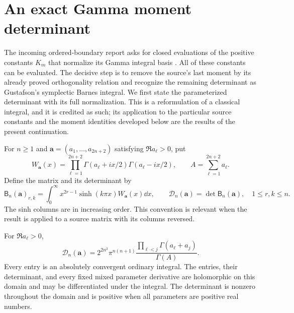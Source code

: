 \section{An exact Gamma moment determinant}
\label{gn:sec:determinant}

The incoming ordered-boundary report asks for closed evaluations of the
positive constants $K_m$ that normalize its Gamma integral basis
\cite[Section~8 and Section~9, question~2]{repoordered}.  All of these
constants can be evaluated.  The decisive step is to remove the source's
last moment by its already proved orthogonality relation and recognize
the remaining determinant as Gustafson's symplectic Barnes integral.
We first state the parameterized determinant with its full normalization.
This is a reformulation of a classical integral, and it is credited as
such; its application to the particular source constants and the moment
identities developed below are the results of the present continuation.

For $n\ge1$ and $\mathbf a=(a_1,\ldots,a_{2n+2})$ satisfying
$\Re a_\ell>0$, put
\begin{equation}\label{gn:eq:weight}
 W_{\mathbf a}(x)=\prod_{\ell=1}^{2n+2}
       \Gamma(a_\ell+ix/2)\Gamma(a_\ell-ix/2),
 \qquad A=\sum_{\ell=1}^{2n+2}a_\ell.
\end{equation}
Define the matrix and its determinant by
\begin{equation}\label{gn:eq:matrix}
 \mathsf B_n(\mathbf a)_{r,k}
 =\int_0^\infty x^{2r-1}\sinh(k\pi x)W_{\mathbf a}(x)\dd x,
 \qquad
 \mathcal D_n(\mathbf a)=\det\mathsf B_n(\mathbf a),
 \quad 1\le r,k\le n.
\end{equation}
The sinh columns are in increasing order.  This convention is relevant
when the result is applied to a source matrix with its columns reversed.

\begin{theorem}
\label{gn:thm:determinant}
For $\Re a_\ell>0$,
\begin{equation}\label{gn:eq:determinant}
 \boxed{\displaystyle
 \mathcal D_n(\mathbf a)
 =2^{2n^2}\pi^{n(n+1)}
       \frac{\prod_{\ell<j}\Gamma(a_\ell+a_j)}{\Gamma(A)}.}
\end{equation}
Every entry is an absolutely convergent ordinary integral.  The entries,
their determinant, and every fixed mixed parameter derivative are
holomorphic on this domain and may be differentiated under the integral.
The determinant is nonzero throughout the domain and is positive when
all parameters are positive real numbers.
\end{theorem}

